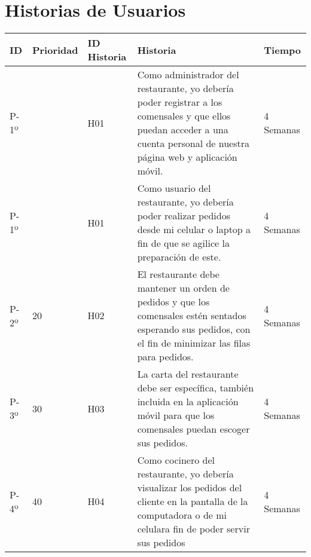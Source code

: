 \chapter{Historias de Usuarios}

\begin{table}[htbp]
	\begin{center}
		\begin{tabular}{| p{0.8cm}|p{2.0cm} | p{2.5 cm} | p{6.0cm}| p{2.0cm} |}
			\hline
			\centering\textbf{ID} & \textbf{Prioridad}& \textbf{ID Historia} & \textbf{Historia} & \textbf{Tiempo}
			
			\\\hline
			
			
			P-1º & \centering 10 & H01 &
			Como administrador del restaurante, yo debería poder registrar a los comensales y que ellos puedan acceder a una cuenta personal de nuestra página web y aplicación móvil.
			
			& 4 Semanas
			
			\\\hline
			P-1º & \centering 10 & H01 &
			Como usuario del restaurante, yo debería poder realizar pedidos desde mi celular o laptop a fin de que se agilice la preparación de este. 
			
			
			& 4 Semanas
			
			\\\hline
			P-2º & 20 & H02 &
			
			El restaurante debe mantener un orden de pedidos y que los comensales estén sentados esperando sus pedidos, con el fin de minimizar las filas para pedidos.
			
			& 4 Semanas
			
			\\\hline
			P-3º & 30 & H03 &
			
			La carta del restaurante debe ser específica, también incluida en la aplicación móvil para que los comensales puedan escoger sus pedidos.
			
			& 4 Semanas
			
			\\\hline
			P-4º & 40 & H04 & 
			
			Como cocinero del restaurante, yo debería visualizar los pedidos del cliente en la pantalla de la computadora o de mi celulara fin de poder servir sus pedidos
			
			& 4 Semanas \\\hline
		\end{tabular}
	\end{center}
\end{table}